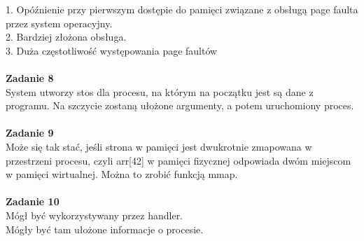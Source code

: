 \documentclass[12pt, a4paper, polish, openany]{book}
\begin{document}
1. Opóźnienie przy pierwszym dostępie do pamięci związane z obsługą page faulta przez
system operacyjny. \\
2. Bardziej złożona obsługa. \\
3. Duża częstotliwość występowania page faultów \\\\
\textbf{Zadanie 8} \\
System utworzy stos dla procesu, na którym na początku jest są dane z programu. Na szczycie zostaną ułożone argumenty, a potem uruchomiony proces. \\\\
\textbf{Zadanie 9} \\
Może się tak stać, jeśli strona w pamięci jest dwukrotnie zmapowana w przestrzeni procesu, czyli arr[42] w pamięci fizycznej odpowiada dwóm miejscom w pamięci wirtualnej. Można to zrobić funkcją mmap. \\\\
\textbf{Zadanie 10} \\
Mógł być wykorzystywany przez handler. \\
Mógły być tam ułożone informacje o procesie. \\\\
\end{document}
